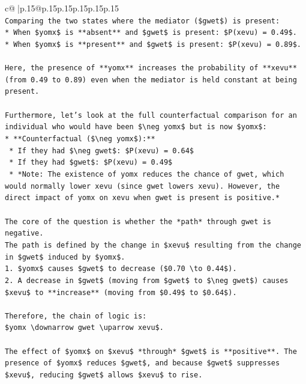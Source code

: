 \documentclass{article}
\begin{document}
{\begin{supertabular}{c@{$\;$}|p{.15\linewidth}@{}p{.15\linewidth}p{.15\linewidth}p{.15\linewidth}p{.15\linewidth}p{.15\linewidth}}
{{{\\ 
\texttt{Comparing the two states where the mediator (\$gwet\$) is present:} \\
\texttt{*   When \$yomx\$ is **absent** and \$gwet\$ is present: \$P(xevu) = 0.49\$.} \\
\texttt{*   When \$yomx\$ is **present** and \$gwet\$ is present: \$P(xevu) = 0.89\$.} \\
\\ 
\texttt{Here, the presence of **yomx** increases the probability of **xevu** (from 0.49 to 0.89) even when the mediator is held constant at being present.} \\
\\ 
\texttt{Furthermore, let's look at the full counterfactual comparison for an individual who would have been \$\textbackslash{}neg yomx\$ but is now \$yomx\$:} \\
\texttt{*   **Counterfactual (\$\textbackslash{}neg yomx\$):**} \\
\texttt{    *   If they had \$\textbackslash{}neg gwet\$: \$P(xevu) = 0.64\$} \\
\texttt{    *   If they had \$gwet\$: \$P(xevu) = 0.49\$} \\
\texttt{    *   *Note: The existence of yomx reduces the chance of gwet, which would normally lower xevu (since gwet lowers xevu). However, the direct impact of yomx on xevu when gwet is present is positive.*} \\
\\ 
\texttt{The core of the question is whether the *path* through gwet is negative.} \\
\texttt{The path is defined by the change in \$xevu\$ resulting from the change in \$gwet\$ induced by \$yomx\$.} \\
\texttt{1.  \$yomx\$ causes \$gwet\$ to decrease (\$0.70 \textbackslash{}to 0.44\$).} \\
\texttt{2.  A decrease in \$gwet\$ (moving from \$gwet\$ to \$\textbackslash{}neg gwet\$) causes \$xevu\$ to **increase** (moving from \$0.49\$ to \$0.64\$).} \\
\\ 
\texttt{Therefore, the chain of logic is:} \\
\texttt{\$yomx \textbackslash{}downarrow gwet \textbackslash{}uparrow xevu\$.} \\
\\ 
\texttt{The effect of \$yomx\$ on \$xevu\$ *through* \$gwet\$ is **positive**. The presence of \$yomx\$ reduces \$gwet\$, and because \$gwet\$ suppresses \$xevu\$, reducing \$gwet\$ allows \$xevu\$ to rise.} \\
}}}
\end{supertabular}}
\end{document}
